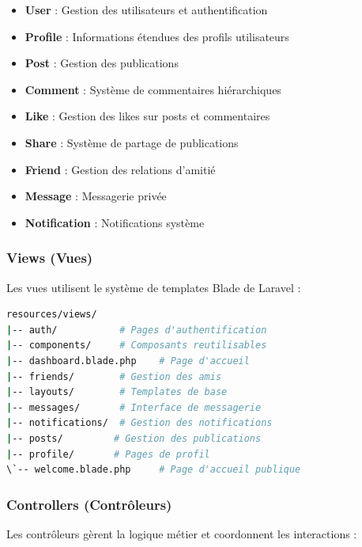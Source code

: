 \documentclass[12pt,a4paper]{article}
\begin{document}
\begin{itemize}
    \item \textbf{User} : Gestion des utilisateurs et authentification
    \item \textbf{Profile} : Informations \'etendues des profils utilisateurs
    \item \textbf{Post} : Gestion des publications
    \item \textbf{Comment} : Syst\`eme de commentaires hi\'erarchiques
    \item \textbf{Like} : Gestion des likes sur posts et commentaires
    \item \textbf{Share} : Syst\`eme de partage de publications
    \item \textbf{Friend} : Gestion des relations d'amiti\'e
    \item \textbf{Message} : Messagerie priv\'ee
    \item \textbf{Notification} : Notifications syst\`eme
\end{itemize}

\subsubsection{Views (Vues)}
Les vues utilisent le syst\`eme de templates Blade de Laravel :

\begin{lstlisting}[language=bash]
resources/views/
|-- auth/           # Pages d'authentification
|-- components/     # Composants reutilisables
|-- dashboard.blade.php    # Page d'accueil
|-- friends/        # Gestion des amis
|-- layouts/        # Templates de base
|-- messages/       # Interface de messagerie
|-- notifications/  # Gestion des notifications
|-- posts/         # Gestion des publications
|-- profile/       # Pages de profil
\`-- welcome.blade.php     # Page d'accueil publique
\end{lstlisting}

\subsubsection{Controllers (Contr\^oleurs)}
Les contr\^oleurs g\`erent la logique m\'etier et coordonnent les interactions :
\end{document}
